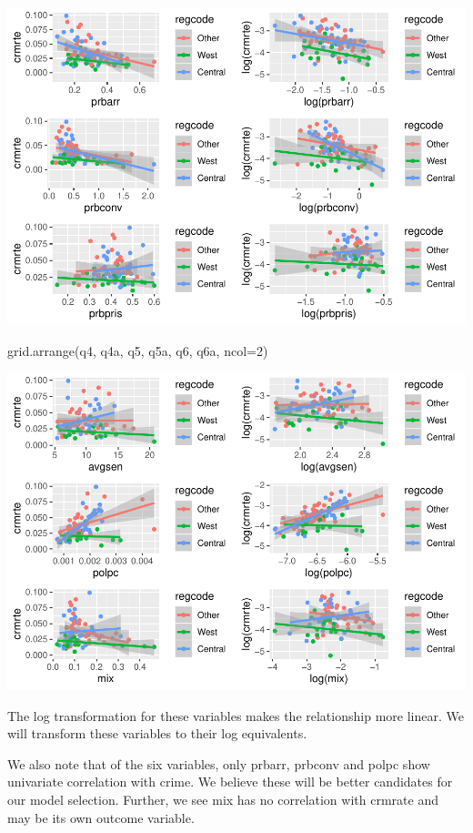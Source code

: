 \documentclass[]{article}
\newenvironment{Shaded}{}{}
\newcommand{\DataTypeTok}[1]{#1}
\newcommand{\DecValTok}[1]{#1}
\newcommand{\KeywordTok}[1]{\textcolor[rgb]{0.00,0.00,1.00}{#1}}
\newcommand{\NormalTok}[1]{#1}
\begin{document}
\includegraphics{Bagnard_Gaustad_Hartman_Leung_Lab_3_files/figure-latex/unnamed-chunk-94-1.pdf}

\begin{Shaded}
\begin{Highlighting}[]
\KeywordTok{grid.arrange}\NormalTok{(q4, q4a, q5, q5a, q6, q6a, }\DataTypeTok{ncol=}\DecValTok{2}\NormalTok{)}
\end{Highlighting}
\end{Shaded}

\includegraphics{Bagnard_Gaustad_Hartman_Leung_Lab_3_files/figure-latex/unnamed-chunk-94-2.pdf}

The log transformation for these variables makes the relationship more
linear. We will transform these variables to their log equivalents.

We also note that of the six variables, only prbarr, prbconv and polpc
show univariate correlation with crime. We believe these will be better
candidates for our model selection. Further, we see mix has no
correlation with crmrate and may be its own outcome variable.
\end{document}
